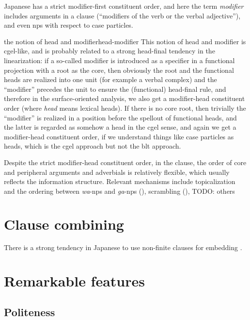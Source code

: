 \documentclass[UTF8, a4paper, oneside, scheme=plain]{ctexrep}
\newcommand*{\term}[1]{\emph{#1}}
\newcommand{\corpus}[1]{\emph{#1}}
\begin{document}
Japanese has a strict modifier-first constituent order,
and here the term \term{modifier} includes 
arguments in a clause (``modifiers of the verb or the verbal adjective''),
and even \acs{np}s with respect to case particles.

\begin{theorybox}{the notion of head and modifier}{head-modifier}
    This notion of head and modifier is \acs{cgel}-like, 
    and is probably related to a strong head-final tendency in the linearization:
    if a so-called modifier is introduced as a specifier 
    in a functional projection with a root as the core,
    then obviously the root and the functional heads are realized into one unit (for example a verbal complex) 
    and the ``modifier'' precedes the unit to ensure the (functional) head-final rule,
    and therefore in the surface-oriented analysis,
    we also get a modifier-head constituent order (where \term{head} means lexical heads).
    If there is no core root,
    then trivially the ``modifier'' is realized in a position before the spellout of functional heads,
    and the latter is regarded as somehow a head in the \acs{cgel} sense,
    and again we get a modifier-head constituent order,
    if we understand things like case particles as heads,
    which is the \ac{cgel} approach but not the \acs{blt} approach.
\end{theorybox}

Despite the strict modifier-head constituent order,
in the clause, the order of core and peripheral arguments and adverbials is relatively flexible,
which usually reflects the information structure.
Relevant mechanisms include 
topicalization and the ordering between \corpus{wa}-\ac{np}s and \corpus{ga}-\ac{np}s 
(), scrambling (), 
TODO: others

\section{Clause combining}

There is a strong tendency in Japanese to use non-finite clauses for embedding \citep{kayne2003antisymmetry}.

\section{Remarkable features}

\subsection{Politeness}\label{sec:politeness-general}
\end{document}
